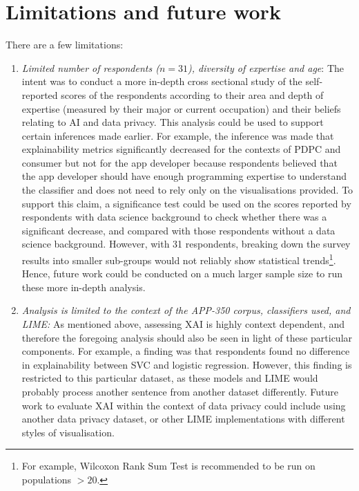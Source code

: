 \section{Limitations and future work}
There are a few limitations:
\begin{enumerate}
    \item \textit{Limited number of respondents ($n = 31$), diversity of expertise and age}: The intent was to conduct a more in-depth cross sectional study of the self-reported scores of the respondents according to their area and depth of expertise (measured by their major or current occupation) and their beliefs relating to AI and data privacy. This analysis could be used to support certain inferences made earlier. For example, the inference was made that explainability metrics significantly decreased for the contexts of PDPC and consumer but not for the app developer because respondents believed that the app developer should have enough programming expertise to understand the classifier and does not need to rely only on the visualisations provided. To support this claim, a significance test could be used on the scores reported by respondents with data science background to check whether there was a significant decrease, and compared with those respondents without a data science background. However, with 31 respondents, breaking down the survey results into smaller sub-groups would not reliably show statistical trends\footnote{For example, Wilcoxon Rank Sum Test is recommended to be run on populations $> 20$.}. Hence, future work could be conducted on a much larger sample size to run these more in-depth analysis.
    
    \item \textit{Analysis is limited to the context of the APP-350 corpus, classifiers used, and LIME:} As mentioned above, assessing XAI is highly context dependent, and therefore the foregoing analysis should also be seen in light of these particular components. For example, a finding was that respondents found no difference in explainability between SVC and logistic regression. However, this finding is restricted to this particular dataset, as these models and LIME would probably process another sentence from another dataset differently. Future work to evaluate XAI within the context of data privacy could include using another data privacy dataset, or other LIME implementations with different styles of visualisation.
    

\end{enumerate}
